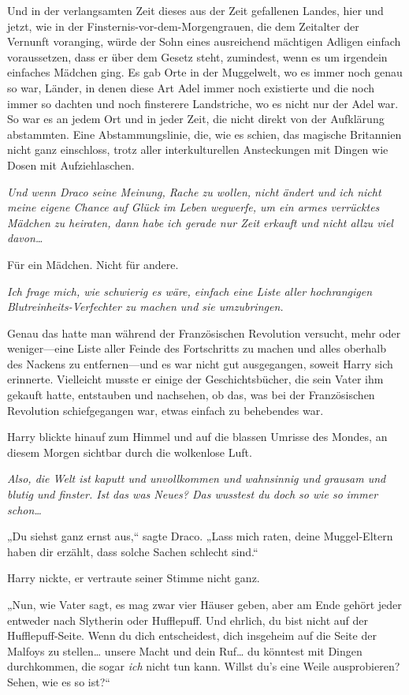 {Und in der verlangsamten Zeit dieses aus der Zeit gefallenen Landes, hier und jetzt, wie in der Finsternis-vor-dem-Morgengrauen, die dem Zeitalter der Vernunft voranging, würde der Sohn eines ausreichend mächtigen Adligen einfach voraussetzen, dass er über dem Gesetz steht, zumindest, wenn es um irgendein einfaches Mädchen ging. Es gab Orte in der Muggelwelt, wo es immer noch genau so war, Länder, in denen diese Art Adel immer noch existierte und die noch immer so dachten und noch finsterere Landstriche, wo es nicht nur der Adel war. So war es an jedem Ort und in jeder Zeit, die nicht direkt von der Aufklärung abstammten. Eine Abstammungslinie, die, wie es schien, das magische Britannien nicht ganz einschloss, trotz aller interkulturellen Ansteckungen mit Dingen wie Dosen mit Aufziehlaschen.

\emph{Und wenn Draco seine Meinung, Rache zu wollen, nicht ändert und ich nicht meine eigene Chance auf Glück im Leben wegwerfe, um ein armes verrücktes Mädchen zu heiraten, dann habe ich gerade nur Zeit erkauft und nicht allzu viel davon…}

Für ein Mädchen. Nicht für andere.

\emph{Ich frage mich, wie schwierig es wäre, einfach eine Liste aller hochrangigen Blutreinheits-Verfechter zu machen und sie umzubringen.}

Genau das hatte man während der Französischen Revolution versucht, mehr oder weniger—eine Liste aller Feinde des Fortschritts zu machen und alles oberhalb des Nackens zu entfernen—und es war nicht gut ausgegangen, soweit Harry sich erinnerte. Vielleicht musste er einige der Geschichtsbücher, die sein Vater ihm gekauft hatte, entstauben und nachsehen, ob das, was bei der Französischen Revolution schiefgegangen war, etwas einfach zu behebendes war.

Harry blickte hinauf zum Himmel und auf die blassen Umrisse des Mondes, an diesem Morgen sichtbar durch die wolkenlose Luft.

\emph{Also, die Welt ist kaputt und unvollkommen und wahnsinnig und grausam und blutig und finster. Ist das was Neues? Das wusstest du doch so wie so} \emph{immer schon…}

„Du siehst ganz ernst aus,“ sagte Draco. „Lass mich raten, deine Muggel-Eltern haben dir erzählt, dass solche Sachen schlecht sind.“

Harry nickte, er vertraute seiner Stimme nicht ganz.

„Nun, wie Vater sagt, es mag zwar vier Häuser geben, aber am Ende gehört jeder entweder nach Slytherin oder Hufflepuff. Und ehrlich, du bist nicht auf der Hufflepuff-Seite. Wenn du dich entscheidest, dich insgeheim auf die Seite der Malfoys zu stellen… unsere Macht und dein Ruf… du könntest mit Dingen durchkommen, die sogar \emph{ich} nicht tun kann. Willst du's eine Weile ausprobieren? Sehen, wie es so ist?“

}
